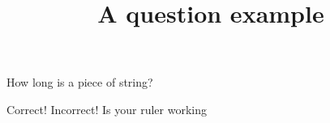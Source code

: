 \documentclass{mathquiz}
\title{A question example}
\begin{document}
  \begin{question}     %
     How long is a piece of string?

     \whenRight Correct!
     \whenWrong Incorrect! Is your ruler working
  \end{question}
\end{document}
